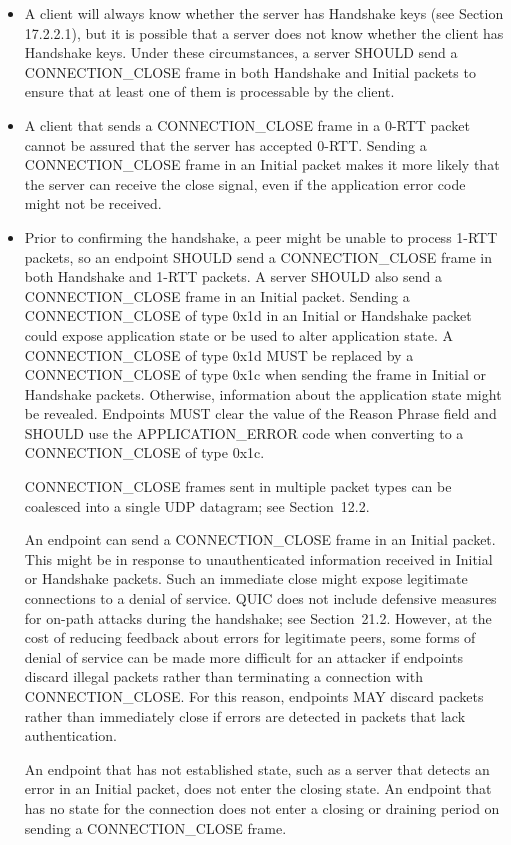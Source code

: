 \documentclass{article}
\begin{document}
\begin{itemize}
\item A client will always know whether the server has Handshake keys (see Section 17.2.2.1), but it is possible that a server does not know whether the client has Handshake keys.  Under these circumstances, a server SHOULD send a CONNECTION\_CLOSE frame in both Handshake and Initial packets to ensure that at least one of them is processable by the client.
\item A client that sends a CONNECTION\_CLOSE frame in a 0-RTT packet cannot be assured that the server has accepted 0-RTT.  Sending a CONNECTION\_CLOSE frame in an Initial packet makes it more likely that the server can receive the close signal, even if the application error code might not be received.
\item Prior to confirming the handshake, a peer might be unable to process 1-RTT packets, so an endpoint SHOULD send a CONNECTION\_CLOSE frame in both Handshake and 1-RTT packets.  A server SHOULD also send a CONNECTION\_CLOSE frame in an Initial packet.
Sending a CONNECTION\_CLOSE of type 0x1d in an Initial or Handshake packet could expose application state or be used to alter application state.  A CONNECTION\_CLOSE of type 0x1d MUST be replaced by a CONNECTION\_CLOSE of type 0x1c when sending the frame in Initial or Handshake packets.  Otherwise, information about the application state might be revealed.  Endpoints MUST clear the value of the Reason Phrase field and SHOULD use the APPLICATION\_ERROR code when converting to a CONNECTION\_CLOSE of type 0x1c.

CONNECTION\_CLOSE frames sent in multiple packet types can be coalesced into a single UDP datagram; see Section~12.2.

An endpoint can send a CONNECTION\_CLOSE frame in an Initial packet. This might be in response to unauthenticated information received in Initial or Handshake packets.  Such an immediate close might expose legitimate connections to a denial of service.  QUIC does not include defensive measures for on-path attacks during the handshake; see Section~21.2.  However, at the cost of reducing feedback about errors for legitimate peers, some forms of denial of service can be made more difficult for an attacker if endpoints discard illegal packets rather than terminating a connection with CONNECTION\_CLOSE.  For this reason, endpoints MAY discard packets rather than immediately close if errors are detected in packets that lack authentication.

An endpoint that has not established state, such as a server that detects an error in an Initial packet, does not enter the closing state.  An endpoint that has no state for the connection does not enter a closing or draining period on sending a CONNECTION\_CLOSE frame.

\end{itemize}
\end{document}
